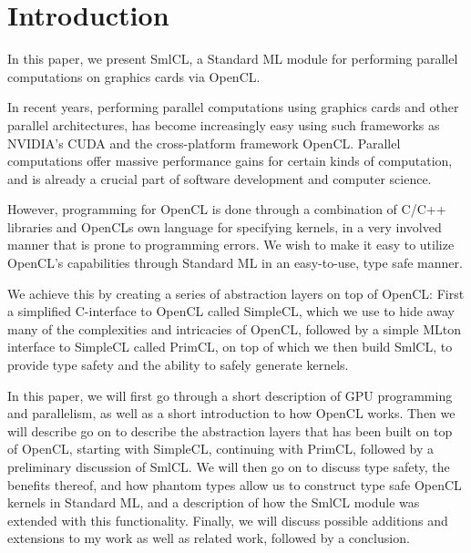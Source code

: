 \section{Introduction}

In this paper, we present SmlCL, a Standard ML module for performing
parallel computations on graphics cards via OpenCL.

In recent years, performing parallel computations using graphics cards
and other parallel architectures, has become increasingly easy using
such frameworks as NVIDIA's CUDA and the cross-platform framework
OpenCL. Parallel computations offer massive performance gains for
certain kinds of computation, and is already a crucial part of
software development and computer science.

However, programming for OpenCL is done through a combination of C/C++
libraries and OpenCLs own language for specifying kernels, in a very
involved manner that is prone to programming errors. We wish to make
it easy to utilize OpenCL's capabilities through Standard ML in an
easy-to-use, type safe manner.

We achieve this by creating a series of abstraction layers on top of
OpenCL: First a simplified C-interface to OpenCL called SimpleCL,
which we use to hide away many of the complexities and intricacies of
OpenCL, followed by a simple MLton interface to SimpleCL called
PrimCL, on top of which we then build SmlCL, to provide type safety
and the ability to safely generate kernels.

In this paper, we will first go through a short description of GPU
programming and parallelism, as well as a short introduction to how
OpenCL works. Then we will describe go on to describe the abstraction
layers that has been built on top of OpenCL, starting with SimpleCL,
continuing with PrimCL, followed by a preliminary discussion of
SmlCL. We will then go on to discuss type safety, the benefits thereof,
and how phantom types allow us to construct type safe OpenCL kernels
in Standard ML, and a description of how the SmlCL module was extended
with this functionality. Finally, we will discuss possible additions and
extensions to my work as well as related work, followed by a
conclusion.
